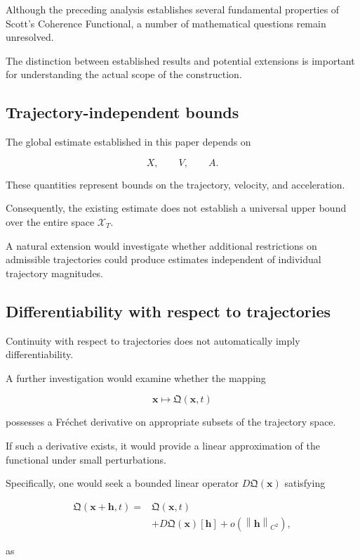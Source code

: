 \documentclass[12pt]{article}
\numberwithin{equation}{section}
\newcommand{\norm}[1]{\left\lVert #1 \right\rVert}
\newcommand{\Q}{\mathfrak{Q}}
\theoremstyle{definition}
\theoremstyle{remark}
\begin{document}
Although the preceding analysis establishes
several fundamental properties of Scott's
Coherence Functional, a number of mathematical
questions remain unresolved.

The distinction between established results
and potential extensions is important
for understanding the actual scope
of the construction.

\subsection{Trajectory-independent bounds}

The global estimate established in this
paper depends on

\[
X,\qquad V,\qquad A.
\]

These quantities represent bounds on
the trajectory, velocity, and acceleration.

Consequently, the existing estimate does
not establish a universal upper bound
over the entire space \(\mathcal{X}_T\).

A natural extension would investigate
whether additional restrictions on admissible
trajectories could produce estimates
independent of individual trajectory
magnitudes.

\subsection{Differentiability with respect
to trajectories}

Continuity with respect to trajectories
does not automatically imply differentiability.

A further investigation would examine
whether the mapping

\[
\mathbf{x}\mapsto\Q(\mathbf{x},t)
\]

possesses a Fréchet derivative on appropriate
subsets of the trajectory space.

If such a derivative exists, it would
provide a linear approximation of the
functional under small perturbations.

Specifically, one would seek a bounded
linear operator \(D\Q(\mathbf{x})\)
satisfying

\[
\begin{aligned}
\Q(\mathbf{x}+\mathbf{h},t)
={}&
\Q(\mathbf{x},t)
\\
&+
D\Q(\mathbf{x})[\mathbf{h}]
+
o(\norm{\mathbf{h}}_{C^2}),
\end{aligned}
\]

as
\end{document}
